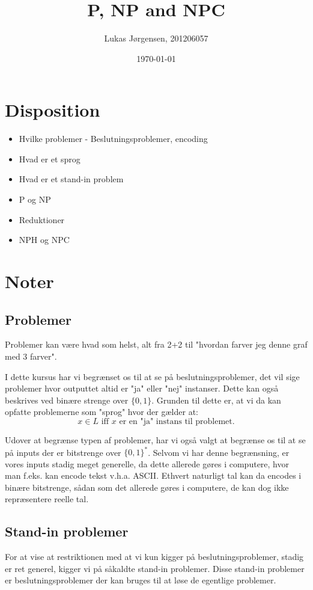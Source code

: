 \documentclass[danish,a4paper,article,12pt]{article}
\title{P, NP and NPC}
\author{Lukas Jørgensen, 201206057
	}
\date{\today}
\begin{document}
\maketitle

\section{Disposition}
\begin{itemize}
\item Hvilke problemer - Beslutningsproblemer, encoding
\item Hvad er et sprog
\item Hvad er et stand-in problem
\item P og NP
\item Reduktioner
\item NPH og NPC
\end{itemize}

\section{Noter}

\subsection{Problemer}
Problemer kan være hvad som helst, alt fra 2+2 til "hvordan farver jeg denne graf med 3 farver".

I dette kursus har vi begrænset os til at se på beslutningsproblemer, det vil sige problemer hvor outputtet altid er "ja" eller "nej" instanser. Dette kan også beskrives ved binære strenge over $\{0,1\}$. Grunden til dette er, at vi da kan opfatte problemerne som "sprog" hvor der gælder at:
\begin{equation}
x\in L \text{ iff $x$ er en "ja" instans til problemet.}
\end{equation}

Udover at begrænse typen af problemer, har vi også valgt at begrænse os til at se på inputs der er bitstrenge over $\{0,1\}^*$. Selvom vi har denne begrænsning, er vores inputs stadig meget generelle, da dette allerede gøres i computere, hvor man f.eks. kan encode tekst v.h.a. ASCII. Ethvert naturligt tal kan da encodes i binære bitstrenge, sådan som det allerede gøres i computere, de kan dog ikke repræsentere reelle tal.

\subsection{Stand-in problemer}
For at vise at restriktionen med at vi kun kigger på beslutningsproblemer, stadig er ret generel, kigger vi på såkaldte stand-in problemer. Disse stand-in problemer er beslutningsproblemer der kan bruges til at løse de egentlige problemer.
\end{document}
